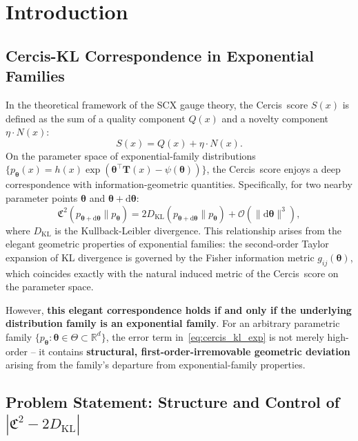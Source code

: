 \documentclass[12pt,a4paper]{article}
\theoremstyle{plain}
\theoremstyle{definition}
\theoremstyle{remark}
\newcommand{\R}{\mathbb{R}}
\newcommand{\SCX}{\textsf{SCX}}
\newcommand{\Cercis}{\textsf{Cercis}}
\newcommand{\dd}{\mathrm{d}}
\newcommand{\DKL}{D_{\mathrm{KL}}}
\newcommand{\CercisScore}{\mathfrak{C}}
\begin{document}
\section{Introduction}
\label{sec:intro}

\subsection{Cercis-KL Correspondence in Exponential Families}

In the theoretical framework of the \SCX{} gauge theory, the \Cercis\ score $S(x)$ is defined as the sum of a quality component $Q(x)$ and a novelty component $\eta \cdot N(x)$:
\begin{equation}\label{eq:cercis_def}
    S(x) = Q(x) + \eta \cdot N(x).
\end{equation}
On the parameter space of exponential-family distributions $\{p_{\bm{\theta}}(x) = h(x)\exp(\bm{\theta}^\top \mathbf{T}(x) - \psi(\bm{\theta}))\}$, the \Cercis\ score enjoys a deep correspondence with information-geometric quantities. Specifically, for two nearby parameter points $\bm{\theta}$ and $\bm{\theta} + \dd\bm{\theta}$:
\begin{equation}\label{eq:cercis_kl_exp}
    \CercisScore^2(p_{\bm{\theta}+\dd\bm{\theta}} \| p_{\bm{\theta}}) = 2\DKL(p_{\bm{\theta}+\dd\bm{\theta}} \| p_{\bm{\theta}}) + \mathcal{O}(\|\dd\bm{\theta}\|^3),
\end{equation}
where $\DKL$ is the Kullback-Leibler divergence. This relationship arises from the elegant geometric properties of exponential families: the second-order Taylor expansion of KL divergence is governed by the Fisher information metric $g_{ij}(\bm{\theta})$, which coincides exactly with the natural induced metric of the \Cercis\ score on the parameter space.

However, \textbf{this elegant correspondence holds if and only if the underlying distribution family is an exponential family}. For an arbitrary parametric family $\{p_{\bm{\theta}} : \bm{\theta} \in \Theta \subset \R^d\}$, the error term in~\eqref{eq:cercis_kl_exp} is not merely high-order -- it contains \textbf{structural, first-order-irremovable geometric deviation} arising from the family's departure from exponential-family properties.

\subsection{Problem Statement: Structure and Control of $|\CercisScore^2 - 2\DKL|$}
\end{document}
